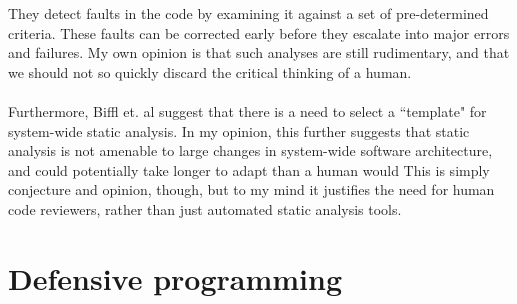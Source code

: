 They detect faults in the code by examining it against a set of pre-determined criteria.
These faults can be corrected early before they escalate into major errors and failures.
My own opinion is that such analyses are still rudimentary, and that we should not so quickly
discard the critical thinking of a human.\\
\\
Furthermore, Biffl et. al \cite{Biffl2012BenefitAutomatedStaticAnalysis} suggest that there is a need to
select a ``template" for system-wide static analysis.
In my opinion, this further suggests that static analysis is not amenable to large changes in
system-wide software architecture, and could potentially take longer to adapt than a human would
This is simply conjecture and opinion, though, but to my mind it justifies the need for human code
reviewers, rather than just automated static analysis tools.

\section{Defensive programming} \label{sec:otherdets:defProg}

